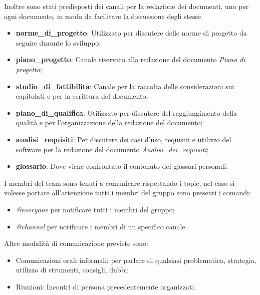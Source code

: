             Inoltre sono stati predisposti dei canali per la redazione dei documenti, uno per ogni documento, in modo da facilitare la discussione degli stessi:
            \begin{itemize}
                \item \textbf{norme\_di\_progetto}: Utilizzato per discutere delle norme di progetto da seguire durante lo sviluppo;
                \item \textbf{piano\_progetto}: Canale riservato alla redazione del documento \textit{Piano di progetto};
                \item \textbf{studio\_di\_fattibilita}: Canale per la raccolta delle considerazioni sui capitolati e per la scrittura del documento;
                \item \textbf{piano\_di\_qualifica}: Utilizzato per discutere del raggiungimento della qualità e per l'organizzazione della redazione del documento;
                \item \textbf{analisi\_requisiti}: Per discutere dei casi d'uso, requisiti e utilizzo del software per la redazione del documento \textit{Analisi\_dei\_requisiti}; 
                \item \textbf{glossario}: Dove viene confrontato il contenuto dei glossari personali.
            \end{itemize}
            
            I membri del team sono tenuti a comunicare rispettando i topic, nel caso si volesse portare all'attenzione tutti i membri del gruppo sono presenti i comandi:
            \begin{itemize}
                \item \textit{@everyone} per notificare tutti i membri del gruppo;
                \item \textit{@channel} per notificare i membri di un specifico canale.
            \end{itemize}
            
          
            Altre modalità di comunicazione previste sono:
            \begin{itemize}
                \item Comunicazioni orali informali: per parlare di qualsiasi problematica, strategia, utilizzo di strumenti, consigli, dubbi;
                \item Riunioni: Incontri di persona precedentemente organizzati.
            \end{itemize}        
